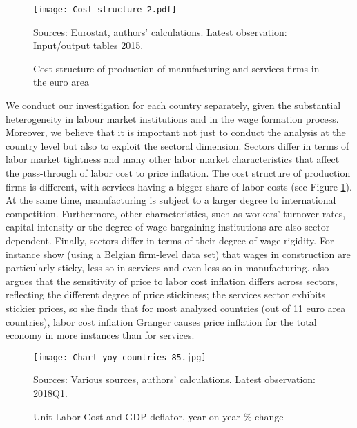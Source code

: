 \documentclass[11pt]{article}
\begin{document}
\begin{figure}[ht]
\begin{center}
\caption{Cost structure of production of manufacturing and services firms 
in the euro area}\label{fig:ProdStructure}
\texttt{[image: Cost\_structure\_2.pdf]}
\begin{minipage}{\textwidth} {\footnotesize
Sources: Eurostat, authors' calculations.
Latest observation: Input/output tables 2015.\par}
\end{minipage}
\end{center}
\end{figure}

We conduct our investigation for each country separately, given the substantial heterogeneity in labour market institutions and in the wage formation process. Moreover, we believe that it is important not just to conduct the analysis at the country level but also to exploit the sectoral dimension. Sectors differ in terms of labor market tightness and many other labor market characteristics that affect the pass-through of labor cost to price inflation. The cost structure of production firms is different, with services having a bigger share of labor costs (see Figure \ref{fig:ProdStructure}). 
At the same time, manufacturing is subject to a larger degree to international competition. Furthermore, other characteristics, such as workers' turnover rates, capital intensity or the degree of wage bargaining institutions are also sector dependent. Finally, sectors differ in terms of their degree of wage rigidity. For instance \cite{DuCaju09} show (using a Belgian firm-level data set) that wages in construction are particularly sticky, less so in services and even less so in manufacturing. \cite{Tatierska_2010} also argues that the sensitivity of price to labor cost inflation differs across sectors, reflecting the different degree of price stickiness; the services sector exhibits stickier prices, so she finds that for most analyzed countries (out of 11 euro area countries), labor cost inflation Granger causes price inflation for the total economy in more instances than for services.

\begin{figure}
\begin{center}
\caption{Unit Labor Cost and GDP deflator, year on year \% change}\label{fig:Figure_yoycountries}
\texttt{[image: Chart\_yoy\_countries\_85.jpg]}
\begin{minipage}{\textwidth} {\footnotesize
Sources: Various sources, authors' calculations.
Latest observation: 2018Q1.\par}
\end{minipage}
\end{center}
\end{figure}
\end{document}
